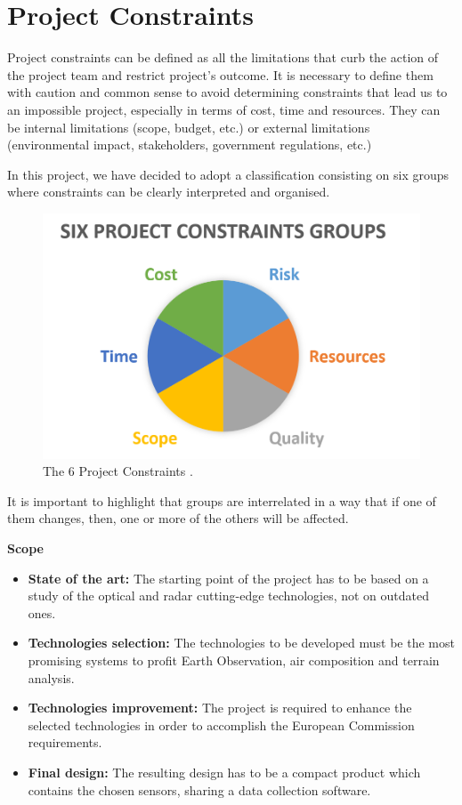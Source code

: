 \section{Project Constraints}

Project constraints can be defined as all the limitations that curb the action of the project team and restrict project’s outcome. It is necessary to define them with caution and common sense to avoid determining constraints that lead us to an impossible project, especially in terms of cost, time and resources. They can be internal limitations (scope, budget, etc.) or external limitations (environmental impact, stakeholders, government regulations, etc.)

In this project, we have decided to adopt a classification consisting on six groups \cite{workfront2017} where constraints can be clearly interpreted and organised.

\begin{figure}[H]
	\centering
	\includegraphics[width=0.65\linewidth]{./images/constraints}
	\caption[The 6 Project Constraints]{The 6 Project Constraints \cite{workfront2017}.}
	\label{fig:constraints}
\end{figure}

It is important to highlight that groups are interrelated in a way that if one of them changes, then, one or more of the others will be affected.

\textbf{Scope}

\begin{itemize}
	
	\item \textbf{State of the art:} The starting point of the project has to be based on a study of the optical and radar cutting-edge technologies, not on outdated ones.
	
	\item \textbf{Technologies selection:} The technologies to be developed must be the most promising systems to profit Earth Observation, air composition and terrain analysis.
	
	\item \textbf{Technologies improvement:} The project is required to enhance the selected technologies in order to accomplish the European Commission requirements.
	
	\item \textbf{Final design:} The resulting design has to be a compact product which contains the chosen sensors, sharing a data collection software.
	
\end{itemize}


